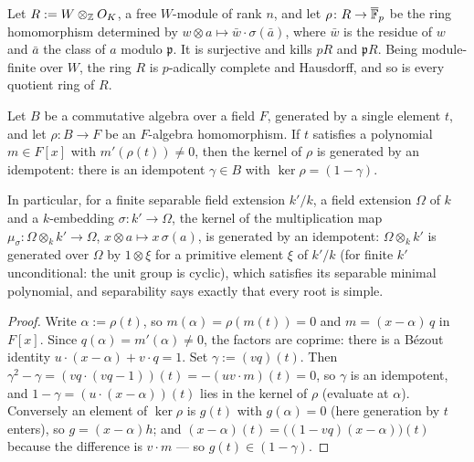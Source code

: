 \begin{definition}
\label{def:witt-tensor}
\leanok
Let $R := W \otimes_{\mathbb{Z}} O_K$, a free $W$-module of rank $n$, and let
$\rho \colon R \to \overline{\mathbb{F}}_p$ be the ring homomorphism determined by
$w \otimes a \mapsto \bar w \cdot \sigma(\bar a)$, where $\bar w$ is the residue of $w$
and $\bar a$ the class of $a$ modulo $\mathfrak p$. It is surjective and kills $pR$ and
$\mathfrak p R$. Being module-finite over $W$, the ring $R$ is $p$-adically complete and
Hausdorff, and so is every quotient ring of $R$.
\end{definition}

\begin{lemma}
\label{lem:residue-split}
\leanok
Let $B$ be a commutative algebra over a field $F$, generated by a single element $t$, and
let $\rho \colon B \to F$ be an $F$-algebra homomorphism. If $t$ satisfies a polynomial
$m \in F[x]$ with $m'(\rho(t)) \neq 0$, then the kernel of $\rho$ is generated by an
idempotent: there is an idempotent $\gamma \in B$ with $\ker \rho = (1 - \gamma)$.

In particular, for a finite separable field extension $k'/k$, a field extension $\Omega$
of $k$ and a $k$-embedding $\sigma \colon k' \to \Omega$, the kernel of the multiplication
map $\mu_\sigma \colon \Omega \otimes_k k' \to \Omega$, $x \otimes a \mapsto x\,\sigma(a)$,
is generated by an idempotent: $\Omega \otimes_k k'$ is generated over $\Omega$ by
$1 \otimes \xi$ for a primitive element $\xi$ of $k'/k$ (for finite $k'$ unconditional:
the unit group is cyclic), which satisfies its separable minimal polynomial, and
separability says exactly that every root is simple.
\end{lemma}
\begin{proof}
\leanok
Write $\alpha := \rho(t)$, so $m(\alpha) = \rho(m(t)) = 0$ and $m = (x - \alpha)\,q$ in
$F[x]$. Since $q(\alpha) = m'(\alpha) \neq 0$, the factors are coprime: there is a
B\'ezout identity $u \cdot (x - \alpha) + v \cdot q = 1$. Set $\gamma := (vq)(t)$. Then
$\gamma^2 - \gamma = (vq \cdot (vq - 1))(t) = -(uv \cdot m)(t) = 0$, so $\gamma$ is an
idempotent, and $1 - \gamma = (u \cdot (x-\alpha))(t)$ lies in the kernel of $\rho$
(evaluate at $\alpha$). Conversely an element of $\ker \rho$ is $g(t)$ with
$g(\alpha) = 0$ (here generation by $t$ enters), so $g = (x - \alpha)h$; and
$(x-\alpha)(t) = \bigl((1 - vq)(x - \alpha)\bigr)(t)$ because the difference is
$v \cdot m$ --- so $g(t) \in (1 - \gamma)$.
\end{proof}

